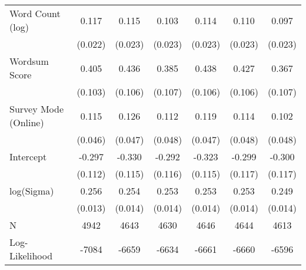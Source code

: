 \begin{table}[ht]
\begin{tabular}{lcccccc}
  Word Count (log) &  0.117 &  0.115 &  0.103 &  0.114 &  0.110 &  0.097 \\ 
   & (0.022) & (0.023) & (0.023) & (0.023) & (0.023) & (0.023) \\ 
  Wordsum Score &  0.405 &  0.436 &  0.385 &  0.438 &  0.427 &  0.367 \\ 
   & (0.103) & (0.106) & (0.107) & (0.106) & (0.106) & (0.107) \\ 
  Survey Mode (Online) &  0.115 &  0.126 &  0.112 &  0.119 &  0.114 &  0.102 \\ 
   & (0.046) & (0.047) & (0.048) & (0.047) & (0.048) & (0.048) \\ 
  Intercept & -0.297 & -0.330 & -0.292 & -0.323 & -0.299 & -0.300 \\ 
   & (0.112) & (0.115) & (0.116) & (0.115) & (0.117) & (0.117) \\ 
  log(Sigma) &  0.256 &  0.254 &  0.253 &  0.253 &  0.253 &  0.249 \\ 
   & (0.013) & (0.014) & (0.014) & (0.014) & (0.014) & (0.014) \\ 
   \hline
N & 4942 & 4643 & 4630 & 4646 & 4644 & 4613 \\ 
  Log-Likelihood & -7084 & -6659 & -6634 & -6661 & -6660 & -6596 \\ 
   \hline
\end{tabular}
\endgroup
\end{table}
